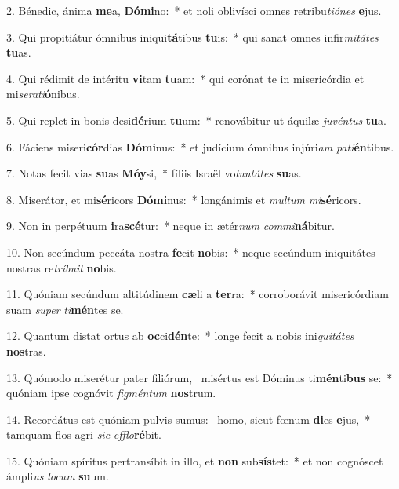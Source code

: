 2. Bénedic, ánima \textbf{me}a, \textbf{Dó}\textbf{mi}no:~*  et noli oblivísci omnes retribu\textit{ti}\textit{ó}\textit{nes} \textbf{e}jus.\

3. Qui propitiátur ómnibus iniqui\textbf{tá}tibus \textbf{tu}is:~*  qui sanat omnes infir\textit{mi}\textit{tá}\textit{tes} \textbf{tu}as.\

4. Qui rédimit de intéritu \textbf{vi}tam \textbf{tu}am:~*  qui corónat te in misericórdia et mi\textit{se}\textit{ra}\textit{ti}\textbf{ó}nibus.\

5. Qui replet in bonis desi\textbf{dé}rium \textbf{tu}um:~*  renovábitur ut áquilæ \textit{ju}\textit{vén}\textit{tus} \textbf{tu}a.\

6. Fáciens miseri\textbf{cór}dias \textbf{Dó}\textbf{mi}nus:~*  et judícium ómnibus injúri\textit{am} \textit{pa}\textit{ti}\textbf{én}tibus.\

7. Notas fecit vias \textbf{su}as \textbf{Mó}\textbf{y}si,~*  fíliis Israël vo\textit{lun}\textit{tá}\textit{tes} \textbf{su}as.\

8. Miserátor, et mi\textbf{sé}ricors \textbf{Dó}\textbf{mi}nus:~*  longánimis et \textit{mul}\textit{tum} \textit{mi}\textbf{sé}ricors.\

9. Non in perpétuum \textbf{i}ra\textbf{scé}tur:~*  neque in ætér\textit{num} \textit{com}\textit{mi}\textbf{ná}bitur.\

10. Non secúndum peccáta nostra \textbf{fe}cit \textbf{no}bis:~*  neque secúndum iniquitátes nostras re\textit{trí}\textit{bu}\textit{it} \textbf{no}bis.\

11. Quóniam secúndum altitúdinem \textbf{cæ}li a \textbf{ter}ra:~*  corroborávit misericórdiam suam \textit{su}\textit{per} \textit{ti}\textbf{mén}tes se.\

12. Quantum distat ortus ab \textbf{oc}ci\textbf{dén}te:~*  longe fecit a nobis ini\textit{qui}\textit{tá}\textit{tes} \textbf{nos}tras.\

13. Quómodo miserétur pater filiórum, \dag\  misértus est Dóminus ti\textbf{mén}ti\textbf{bus} se:~*  quóniam ipse cognóvit \textit{fig}\textit{mén}\textit{tum} \textbf{nos}trum.\

14. Recordátus est quóniam pulvis sumus: \dag\  homo, sicut fœnum \textbf{di}es \textbf{e}jus,~*  tamquam flos agri \textit{sic} \textit{ef}\textit{flo}\textbf{ré}bit.\

15. Quóniam spíritus pertransíbit in illo, et \textbf{non} sub\textbf{sís}tet:~*  et non cognóscet ámpli\textit{us} \textit{lo}\textit{cum} \textbf{su}um.\

